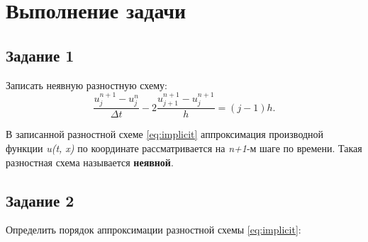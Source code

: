 \documentclass[12pt, a4paper]{report}
\begin{document}
	\section*{Выполнение задачи}

	\subsection*{Задание 1}
	\large
	Записать неявную разностную схему:
	\begin{equation}\label{eq:implicit}
		\frac{u_{j}^{n+1}-u_{j}^{n}}{\Delta t}-2\frac{u_{j+1}^{n+1}-u_{j}^{n+1}}{h}=(j-1)h.
	\end{equation}
	\par
	В записанной разностной схеме \eqref{eq:implicit} аппроксимация производной функции \textit{u(t, x)} по координате рассматривается на \textit{n+1}-м шаге по времени. Такая разностная схема называется \textbf{неявной}.

	\subsection*{Задание 2}
	\large
	Определить порядок аппроксимации разностной схемы \eqref{eq:implicit}: \par
\end{document}
